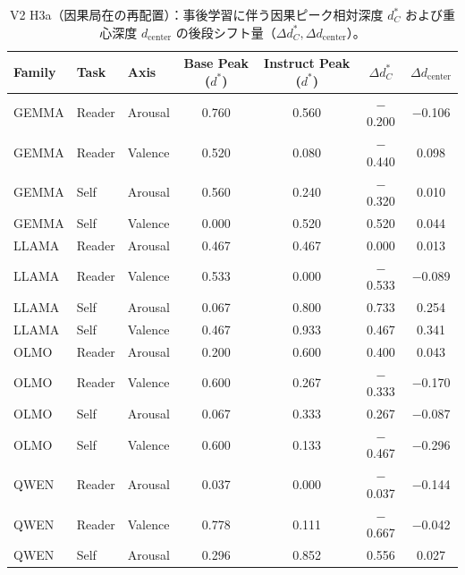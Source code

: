 \begin{table}[htbp]
\centering
\small
\caption{V2 H3a（因果局在の再配置）：事後学習に伴う因果ピーク相対深度 $d_C^*$ および重心深度 $d_{\text{center}}$ の後段シフト量（$\Delta d_C^*, \Delta d_{\text{center}}$）。}
\label{tab:v2_causal_relocation}
\begin{tabular}{lll cccc}
\toprule
\textbf{Family} & \textbf{Task} & \textbf{Axis} & \textbf{Base Peak ($d^*$)} & \textbf{Instruct Peak ($d^*$)} & $\Delta d_C^*$ & $\Delta d_{\text{center}}$ \\
\midrule
GEMMA      & Reader   & Arousal  & 0.760          & 0.560            & $-$0.200   & $-$0.106   \\
GEMMA      & Reader   & Valence  & 0.520          & 0.080            & $-$0.440   & 0.098      \\
GEMMA      & Self     & Arousal  & 0.560          & 0.240            & $-$0.320   & 0.010      \\
GEMMA      & Self     & Valence  & 0.000          & 0.520            & 0.520      & 0.044      \\
LLAMA      & Reader   & Arousal  & 0.467          & 0.467            & 0.000      & 0.013      \\
LLAMA      & Reader   & Valence  & 0.533          & 0.000            & $-$0.533   & $-$0.089   \\
LLAMA      & Self     & Arousal  & 0.067          & 0.800            & 0.733      & 0.254      \\
LLAMA      & Self     & Valence  & 0.467          & 0.933            & 0.467      & 0.341      \\
OLMO       & Reader   & Arousal  & 0.200          & 0.600            & 0.400      & 0.043      \\
OLMO       & Reader   & Valence  & 0.600          & 0.267            & $-$0.333   & $-$0.170   \\
OLMO       & Self     & Arousal  & 0.067          & 0.333            & 0.267      & $-$0.087   \\
OLMO       & Self     & Valence  & 0.600          & 0.133            & $-$0.467   & $-$0.296   \\
QWEN       & Reader   & Arousal  & 0.037          & 0.000            & $-$0.037   & $-$0.144   \\
QWEN       & Reader   & Valence  & 0.778          & 0.111            & $-$0.667   & $-$0.042   \\
QWEN       & Self     & Arousal  & 0.296          & 0.852            & 0.556      & 0.027      \\

\end{tabular}
\end{table}
